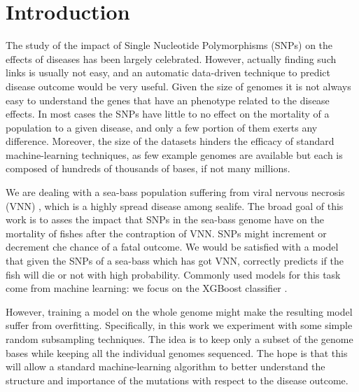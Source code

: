 \section{Introduction}
\label{sec:intro}
The study of the impact of Single Nucleotide Polymorphisms (SNPs) on the effects of diseases has been largely celebrated. 
However, actually finding such links is usually not easy, and an automatic data-driven technique to predict disease outcome would be very useful.
Given the size of genomes it is not always easy to understand the genes that have an phenotype related to the disease effects.
In most cases the SNPs have little to no effect on the mortality of a population to a given disease, and only a few portion of them exerts any difference.
Moreover, the size of the datasets hinders the efficacy of standard machine-learning techniques, as few example genomes are available but each is composed of hundreds of thousands of bases, if not many millions.

We are dealing with a sea-bass population suffering from viral nervous necrosis (VNN) \cite{faldani2025machine}, which is a highly spread disease among sealife.
The broad goal of this work is to asses the impact that SNPs in the sea-bass genome have on the mortality of fishes after the contraption of VNN.
SNPs might increment or decrement che chance of a fatal outcome. 
We would be satisfied with a model that given the SNPs of a sea-bass which has got VNN, correctly predicts if the fish will die or not with high probability.
Commonly used models for this task come from machine learning: we focus on the XGBoost classifier \cite{xgboost}.

However, training a model on the whole genome might make the resulting model suffer from overfitting.
Specifically, in this work we experiment with some simple random subsampling techniques.
The idea is to keep only a subset of the genome bases while keeping all the individual genomes sequenced.
The hope is that this will allow a standard machine-learning algorithm to better understand the structure and importance of the mutations with respect to the disease outcome.

